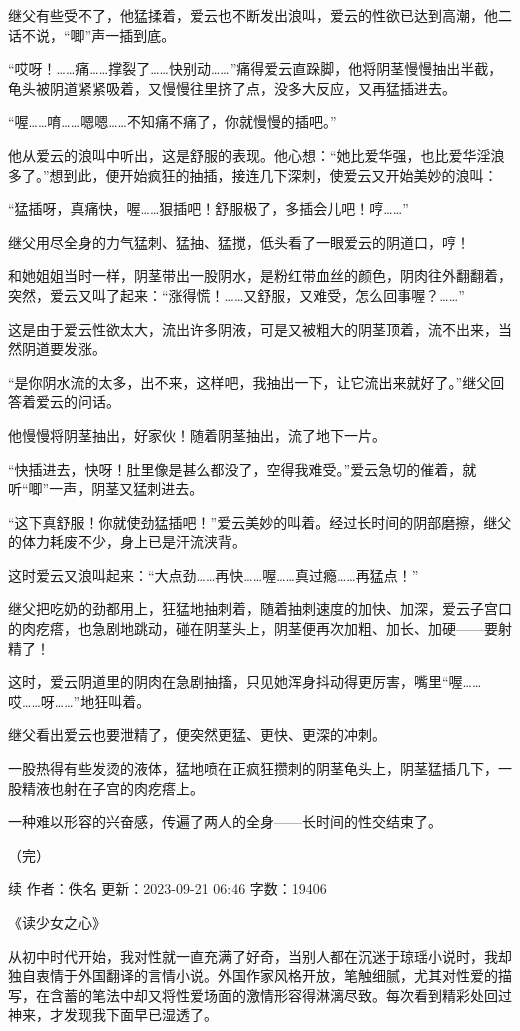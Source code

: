 \documentclass[12pt,UTF8]{ctexbook}
\begin{document}
继父有些受不了，他猛揉着，爱云也不断发出浪叫，爱云的性欲已达到高潮，他二话不说，“唧”声一插到底。

“哎呀！……痛……撑裂了……快别动……”痛得爱云直跺脚，他将阴茎慢慢抽出半截，龟头被阴道紧紧吸着，又慢慢往里挤了点，没多大反应，又再猛插进去。

“喔……唷……嗯嗯……不知痛不痛了，你就慢慢的插吧。”

他从爱云的浪叫中听出，这是舒服的表现。他心想：“她比爱华强，也比爱华淫浪多了。”想到此，便开始疯狂的抽插，接连几下深刺，使爱云又开始美妙的浪叫：

“猛插呀，真痛快，喔……狠插吧！舒服极了，多插会儿吧！哼……”

继父用尽全身的力气猛刺、猛抽、猛搅，低头看了一眼爱云的阴道口，哼！

和她姐姐当时一样，阴茎带出一股阴水，是粉红带血丝的颜色，阴肉往外翻翻着，突然，爱云又叫了起来：“涨得慌！……又舒服，又难受，怎么回事喔？……”

这是由于爱云性欲太大，流出许多阴液，可是又被粗大的阴茎顶着，流不出来，当然阴道要发涨。

“是你阴水流的太多，出不来，这样吧，我抽出一下，让它流出来就好了。”继父回答着爱云的问话。

他慢慢将阴茎抽出，好家伙！随着阴茎抽出，流了地下一片。

“快插进去，快呀！肚里像是甚么都没了，空得我难受。”爱云急切的催着，就听“唧”一声，阴茎又猛刺进去。

“这下真舒服！你就使劲猛插吧！”爱云美妙的叫着。经过长时间的阴部磨擦，继父的体力耗废不少，身上已是汗流浃背。

这时爱云又浪叫起来：“大点劲……再快……喔……真过瘾……再猛点！”

继父把吃奶的劲都用上，狂猛地抽刺着，随着抽刺速度的加快、加深，爱云子宫口的肉疙瘩，也急剧地跳动，碰在阴茎头上，阴茎便再次加粗、加长、加硬——要射精了！

这时，爱云阴道里的阴肉在急剧抽搐，只见她浑身抖动得更厉害，嘴里“喔……哎……呀……”地狂叫着。

继父看出爱云也要泄精了，便突然更猛、更快、更深的冲刺。

一股热得有些发烫的液体，猛地喷在正疯狂攒刺的阴茎龟头上，阴茎猛插几下，一股精液也射在子宫的肉疙瘩上。

一种难以形容的兴奋感，传遍了两人的全身——长时间的性交结束了。

（完）

续
作者：佚名      更新：2023-09-21 06:46      字数：19406

《读少女之心》

从初中时代开始，我对性就一直充满了好奇，当别人都在沉迷于琼瑶小说时，我却独自衷情于外国翻译的言情小说。外国作家风格开放，笔触细腻，尤其对性爱的描写，在含蓄的笔法中却又将性爱场面的激情形容得淋漓尽致。每次看到精彩处回过神来，才发现我下面早已湿透了。
\end{document}
